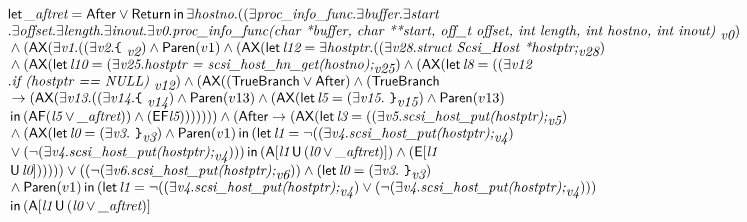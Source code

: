 \documentclass{article}
\newcommand{\U}{\,\mbox{\sf{U}}\,}
\newcommand{\A}{\mbox{\sf{A}}}
\newcommand{\E}{\mbox{\sf{E}}}
\newcommand{\AX}{\mbox{\sf{AX}}}
\newcommand{\AF}{\mbox{\sf{AF}}}
\newcommand{\EF}{\mbox{\sf{EF}}}
\newcommand{\mita}[1]{\mbox{\it{{#1}}}}
\newcommand{\msf}[1]{\mbox{\sf{{#1}}}}
\newcommand{\ttlb}{\mbox{\tt \char'173}}
\newcommand{\ttrb}{\mbox{\tt \char'175}}
\begin{document}
\[\begin{array}{l}
\mita{\sf{let}} \, \mita{\_aftret} = \msf{After} \vee \msf{Return} \, \mita{\sf{in}} \, \exists \mita{hostno} . ((\exists \mita{proc\_info\_func} . \exists \mita{buffer} . \exists \mita{start}\\\mbox{} . \exists \mita{offset} . \exists \mita{length} . \exists \mita{inout} . \exists \mita{v0} . \mita{proc\_info\_func(char *buffer, char **start, off\_t offset, int length,
               int hostno, int inout) }_{\mita{v0}})\\\mbox{} \wedge (\AX(\exists \mita{v1} . ((\exists \mita{v2} . \mita{{\ttlb}
  }_{\mita{v2}}) \wedge \msf{Paren}(v1) \wedge (\AX(\mita{\sf{let}} \, \mita{l12} = \exists \mita{hostptr} . ((\exists \mita{v28} . \mita{struct Scsi\_Host *hostptr;}_{\mita{v28}})\\\mbox{} \wedge (\AX(\mita{\sf{let}} \, \mita{l10} = (\exists \mita{v25} . \mita{hostptr = scsi\_host\_hn\_get(hostno);}_{\mita{v25}}) \wedge (\AX(\mita{\sf{let}} \, \mita{l8} = ((\exists \mita{v12}\\\mbox{} . \mita{if (hostptr == NULL) }_{\mita{v12}}) \wedge (\AX((\msf{TrueBranch} \vee \msf{After}) \wedge (\msf{TrueBranch}\\\mbox{} \rightarrow (\AX(\exists \mita{v13} . ((\exists \mita{v14} . \mita{{\ttlb}
  }_{\mita{v14}}) \wedge \msf{Paren}(v13) \wedge (\AX(\mita{\sf{let}} \, \mita{l5} = (\exists \mita{v15} . \mita{
{\ttrb}}_{\mita{v15}}) \wedge \msf{Paren}(v13)\\\mbox{} \, \mita{\sf{in}} \, (\AF(\mita{l5} \vee \mita{\_aftret})) \wedge (\EF\mita{l5})
)))))) \wedge (\msf{After} \rightarrow (\AX(\mita{\sf{let}} \, \mita{l3} = ((\exists \mita{v5} . \mita{scsi\_host\_put(hostptr);}_{\mita{v5}})\\\mbox{} \wedge (\AX(\mita{\sf{let}} \, \mita{l0} = (\exists \mita{v3} . \mita{
{\ttrb}}_{\mita{v3}}) \wedge \msf{Paren}(v1) \, \mita{\sf{in}} \, (\mita{\sf{let}} \, \mita{l1} = \neg ((\exists \mita{v4} . \mita{scsi\_host\_put(hostptr);}_{\mita{v4}})\\\mbox{} \vee (\neg (\exists \mita{v4} . \mita{scsi\_host\_put(hostptr);}_{\mita{v4}}))) \, \mita{\sf{in}} \, (\A[\mita{l1} \U (\mita{l0} \vee \mita{\_aftret})]
) \wedge (\E[\mita{l1}\\\mbox{} \U \mita{l0}]
)
)
))) \vee ((\neg (\exists \mita{v6} . \mita{scsi\_host\_put(hostptr);}_{\mita{v6}})) \wedge (\mita{\sf{let}} \, \mita{l0} = (\exists \mita{v3} . \mita{
{\ttrb}}_{\mita{v3}})\\\mbox{} \wedge \msf{Paren}(v1) \, \mita{\sf{in}} \, (\mita{\sf{let}} \, \mita{l1} = \neg ((\exists \mita{v4} . \mita{scsi\_host\_put(hostptr);}_{\mita{v4}}) \vee (\neg (\exists \mita{v4} . \mita{scsi\_host\_put(hostptr);}_{\mita{v4}})))\\\mbox{} \, \mita{\sf{in}} \, (\A[\mita{l1} \U (\mita{l0} \vee \mita{\_aftret})]

\end{array}\]
\end{document}
